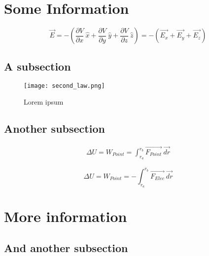 
\section{Some Information}

\lipsum[0-1]

\begin{equation}
    \vec{E} = - \left( \frac{\partial V}{\partial x} \ \hat{x} + \frac{\partial V}{\partial y} \ \hat{y} + 
    \frac{\partial V}{\partial z} \ \hat{z} \right) = - (\vec{E_{x}} + \vec{E_{y}} + \vec{E_{z}})
\end{equation}

\lipsum[2-3]

\subsection{A subsection}

\lipsum[4-5]

\begin{figure}[h]
    \texttt{[image: second\_law.png]}
    \centering
    \caption{Lorem ipsum}
    \label{fig:lorem-ipsum}
\end{figure}

\lipsum[6]

\subsection{Another subsection}

\lipsum[7]

\begin{align*}
    \Delta U = W_{Point} = \int_{r_{a}}^{r_{b}} \vec{F_{Point}} \ \vec{dr}
\end{align*}    

\begin{equation}
    \Delta U = W_{Point} = - \int_{r_{a}}^{r_{b}} \vec{F_{Elec}} \ \vec{dr}
\end{equation} 

\lipsum[8]

\section{More information}

\lipsum[9-11]

\subsection{And another subsection}

\lipsum[11-13]

